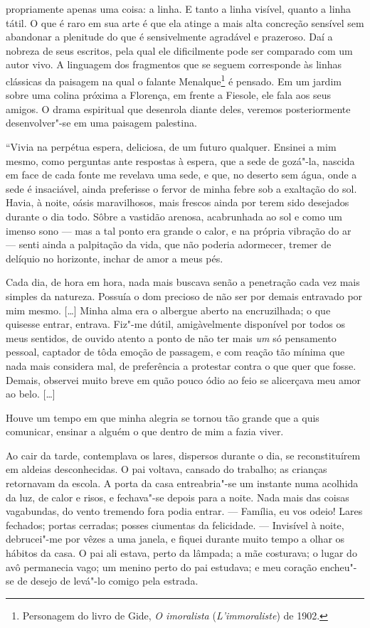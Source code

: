 propriamente apenas uma coisa: a linha. E tanto a linha visível,
quanto a linha tátil. O que é raro em sua arte é que ela atinge
a mais alta concreção sensível sem abandonar a plenitude do que é
sensivelmente agradável e prazeroso. Daí a nobreza de seus escritos, pela
qual ele dificilmente pode ser comparado com um autor vivo. A
linguagem dos fragmentos que se seguem corresponde às linhas clássicas
da paisagem na qual o falante Menalque\footnote{Personagem do
  livro de Gide, \emph{O imoralista} (\emph{L'immoraliste}) de 1902. \versal{[N. T.]}} é
pensado. Em um jardim sobre uma colina próxima a Florença, em frente a
Fiesole, ele fala aos seus amigos. O drama espiritual que desenrola
diante deles, veremos posteriormente desenvolver"-se em uma paisagem
palestina.

``Vivia na perpétua espera, deliciosa, de um futuro qualquer. Ensinei a
mim mesmo, como perguntas ante respostas à espera, que a sede de
gozá"-la, nascida em face de cada fonte me revelava uma sede, e que, no
deserto sem água, onde a sede é insaciável, ainda preferisse o fervor de
minha febre sob a exaltação do sol. Havia, à noite, oásis maravilhosos,
mais frescos ainda por terem sido desejados durante o dia todo. Sôbre a
vastidão arenosa, acabrunhada ao sol e como um imenso sono --- mas a tal
ponto era grande o calor, e na própria vibração do ar --- senti ainda a
palpitação da vida, que não poderia adormecer, tremer de delíquio no
horizonte, inchar de amor a meus pés.

Cada dia, de hora em hora, nada mais buscava senão a penetração cada vez
mais simples da natureza. Possuía o dom precioso de não ser por demais
entravado por mim mesmo. {[}\ldots{}{]} Minha alma era o albergue aberto na
encruzilhada; o que quisesse entrar, entrava. Fiz"-me dútil,
amigàvelmente disponível por todos os meus sentidos, de ouvido atento a
ponto de não ter mais \emph{um} só pensamento pessoal, captador de tôda
emoção de passagem, e com reação tão mínima que nada mais considera mal,
de preferência a protestar contra o que quer que fosse. Demais, observei
muito breve em quão pouco ódio ao feio se alicerçava meu amor ao belo.
{[}\ldots{}{]}

Houve um tempo em que minha alegria se tornou tão grande que a quis
comunicar, ensinar a alguém o que dentro de mim a fazia viver.

Ao cair da tarde, contemplava os lares, dispersos durante o dia, se
reconstituírem em aldeias desconhecidas. O pai voltava, cansado do
trabalho; as crianças retornavam da escola. A porta da casa
entreabria"-se um instante numa acolhida da luz, de calor e risos, e
fechava"-se depois para a noite. Nada mais das coisas vagabundas, do
vento tremendo fora podia entrar. --- Família, eu vos odeio! Lares
fechados; portas cerradas; posses ciumentas da felicidade. --- Invisível
à noite, debrucei"-me por vêzes a uma janela, e fiquei durante muito
tempo a olhar os hábitos da casa. O pai ali estava, perto da lâmpada; a
mãe costurava; o lugar do avô permanecia vago; um menino perto do pai
estudava; e meu coração encheu"-se de desejo de levá"-lo comigo pela
estrada.

